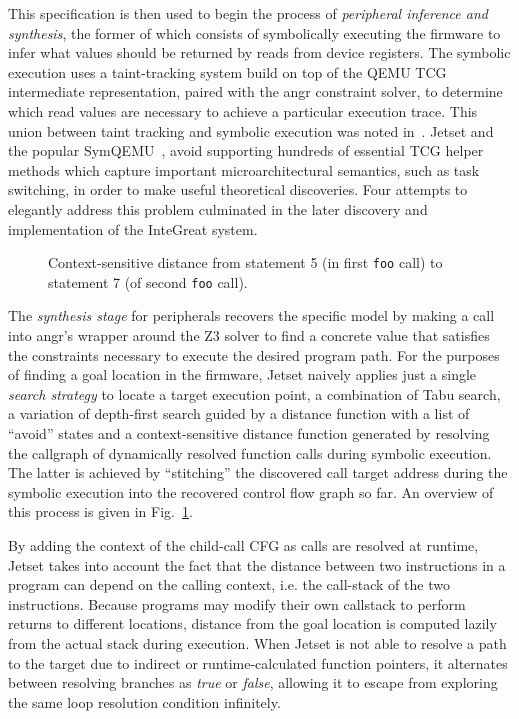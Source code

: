 This specification is then used to begin the process of \emph{peripheral inference and synthesis}, the former of which consists of symbolically executing the firmware to infer what values should be returned by reads from device registers.
The symbolic execution uses a taint-tracking system build on top of the QEMU TCG intermediate representation, paired with the angr constraint solver, to determine which read values are necessary to achieve a particular execution trace.
This union between taint tracking and symbolic execution was noted in~\cite{schwartz2010all}.
Jetset and the popular SymQEMU~\cite{poeplau2021symqemu}, avoid supporting hundreds of essential TCG helper methods which capture important microarchitectural semantics, such as task switching, in order to make useful theoretical discoveries.
Four attempts to elegantly address this problem culminated in the later discovery and implementation of the InteGreat system.

\begin{figure}
\centering

\caption{Context-sensitive distance from statement 5 (in first \texttt{foo} call) to statement 7 (of second \texttt{foo} call).}
\label{fig:distance_func}
\end{figure}

The \emph{synthesis stage} for peripherals recovers the specific model by making a call into angr's wrapper around the Z3 solver to find a concrete value that satisfies the constraints necessary to execute the desired program path.
For the purposes of finding a goal location in the firmware, Jetset naively applies just a single \emph{search strategy} to locate a target execution point, a combination of Tabu search, a variation of depth-first search guided by a distance function with a list of ``avoid'' states and a context-sensitive distance function generated by resolving the callgraph of dynamically resolved function calls during symbolic execution.
The latter is achieved by ``stitching'' the discovered call target address during the symbolic execution into the recovered control flow graph so far.
An overview of this process is given in Fig.~\ref{fig:distance_func}.

By adding the context of the child-call CFG as calls are resolved at runtime, Jetset takes into account the fact that the distance between two instructions in a program can depend on the calling context, i.e. the call-stack of the two instructions.
Because programs may modify their own callstack to perform returns to different locations, distance from the goal location is computed lazily from the actual stack during execution.
When Jetset is not able to resolve a path to the target due to indirect or runtime-calculated function pointers, it alternates between resolving branches as \emph{true} or \emph{false}, allowing it to escape from exploring the same loop resolution condition infinitely.

